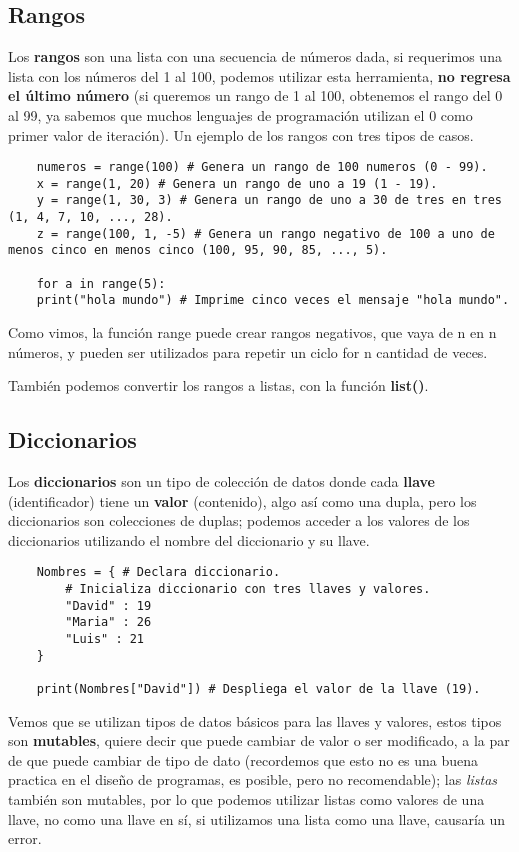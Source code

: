 \subsection{Rangos}

Los \textbf{rangos} son una lista con una secuencia de números dada, si requerimos una lista con los números del 1 al 100, podemos utilizar esta herramienta, \textbf{no regresa el último número} (si queremos un rango de 1 al 100, obtenemos el rango del 0 al 99, ya sabemos que muchos lenguajes de programación utilizan el 0 como primer valor de iteración). Un ejemplo de los rangos con tres tipos de casos.
\begin{lstlisting}
    numeros = range(100) # Genera un rango de 100 numeros (0 - 99).
    x = range(1, 20) # Genera un rango de uno a 19 (1 - 19).
    y = range(1, 30, 3) # Genera un rango de uno a 30 de tres en tres (1, 4, 7, 10, ..., 28).
    z = range(100, 1, -5) # Genera un rango negativo de 100 a uno de menos cinco en menos cinco (100, 95, 90, 85, ..., 5).
	
    for a in range(5):
	print("hola mundo") # Imprime cinco veces el mensaje "hola mundo".
\end{lstlisting}

Como vimos, la función range puede crear rangos negativos, que vaya de n en n números, y pueden ser utilizados para repetir un ciclo for n cantidad de veces.

También podemos convertir los rangos a listas, con la función \textbf{list()}.


\subsection{Diccionarios}

Los \textbf{diccionarios} son un tipo de colección de datos donde cada \textbf{llave} (identificador) tiene un \textbf{valor} (contenido), algo así como una dupla, pero los diccionarios son colecciones de duplas; podemos acceder a los valores de los diccionarios utilizando el nombre del diccionario y su llave.
\begin{lstlisting}
    Nombres = { # Declara diccionario.
        # Inicializa diccionario con tres llaves y valores.
        "David" : 19
        "Maria" : 26
        "Luis" : 21
    }

    print(Nombres["David"]) # Despliega el valor de la llave (19).
\end{lstlisting}

Vemos que se utilizan tipos de datos básicos para las llaves y valores, estos tipos son \textbf{mutables}, quiere decir que puede cambiar de valor o ser modificado, a la par de que puede cambiar de tipo de dato (recordemos que esto no es una buena practica en el diseño de programas, es posible, pero no recomendable); las \textit{listas} también son mutables, por lo que podemos utilizar listas como valores de una llave, no como una llave en sí, si utilizamos una lista como una llave, causaría un error.


